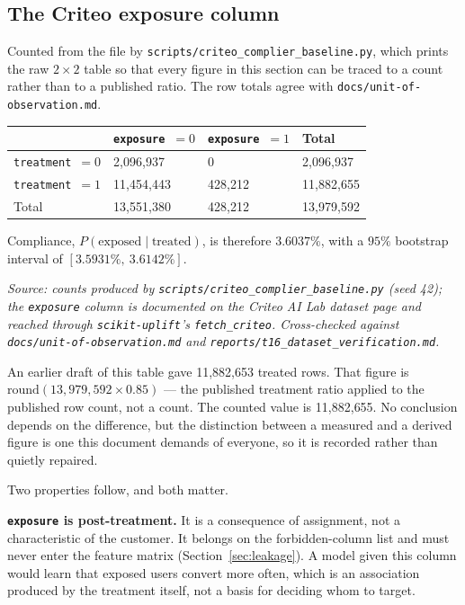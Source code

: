 \documentclass[11pt,a4paper]{article}
\newcommand{\srcnote}[1]{{\footnotesize\itshape\color{teal}Source: #1}}
\begin{document}
\subsection{The Criteo exposure column}

Counted from the file by \texttt{scripts/criteo\_complier\_baseline.py}, which prints the raw
$2\times2$ table so that every figure in this section can be traced to a count rather than to a
published ratio. The row totals agree with \texttt{docs/unit-of-observation.md}.

\begin{tabularx}{\textwidth}{@{}L{3.6cm}L{3.0cm}L{3.0cm}X@{}}
\toprule
 & \textbf{\texttt{exposure}~$=0$} & \textbf{\texttt{exposure}~$=1$} & \textbf{Total} \\
\midrule
\texttt{treatment}~$=0$ & 2{,}096{,}937 & 0 & 2{,}096{,}937 \\
\texttt{treatment}~$=1$ & 11{,}454{,}443 & 428{,}212 & 11{,}882{,}655 \\
Total & 13{,}551{,}380 & 428{,}212 & 13{,}979{,}592 \\
\bottomrule
\end{tabularx}

\medskip

Compliance, $P(\text{exposed} \mid \text{treated})$, is therefore $3.6037\%$, with a $95\%$
bootstrap interval of $[3.5931\%,\ 3.6142\%]$.

\srcnote{counts produced by \texttt{scripts/criteo\_complier\_baseline.py} (seed 42); the
\texttt{exposure} column is documented on the Criteo AI Lab dataset page and reached through
\texttt{scikit-uplift}'s \texttt{fetch\_criteo}. Cross-checked against
\texttt{docs/unit-of-observation.md} and \texttt{reports/t16\_dataset\_verification.md}.}

\medskip

An earlier draft of this table gave 11{,}882{,}653 treated rows. That figure is
$\text{round}(13{,}979{,}592 \times 0.85)$ --- the published treatment ratio applied to the
published row count, not a count. The counted value is 11{,}882{,}655. No conclusion depends on the
difference, but the distinction between a measured and a derived figure is one this document
demands of everyone, so it is recorded rather than quietly repaired.

\medskip

Two properties follow, and both matter.

\textbf{\texttt{exposure} is post-treatment.} It is a consequence of assignment, not a
characteristic of the customer. It belongs on the forbidden-column list and must never enter the
feature matrix (Section~\ref{sec:leakage}). A model given this column would
learn that exposed users convert more often, which is an association produced by the treatment
itself, not a basis for deciding whom to target.
\end{document}
